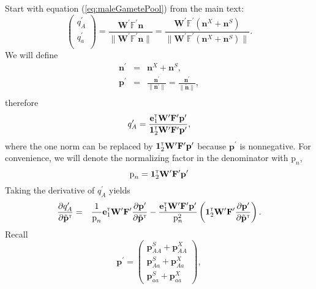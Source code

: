 \documentclass[11pt]{article}
\def\mbf#1{\mathbf{#1}}
\def\mbb#1{\mathbb{#1}}
\newcommand{\bo}[1]{{\bf #1}}
\newcommand{\tr}{{\mbox{\tiny \sf T}}}
\begin{document}
 Start with equation (\ref{eq:maleGametePool}) from the main text:
\begin{equation} \label{eq:maleGametePool_app}
	\left(
		\begin{array}{c}
			q^{\prime}_{A} \\
			q^{\prime}_{a} \\
		\end{array} \right) = 
			\frac{\mbf{W}^{\prime} \mbb{F}^{\prime} \mbf{n}}{\| \mbf{W}^{\prime} \mbb{F}^{\prime} \mbf{n} \|} = 
				\frac{\mbf{W}^{\prime} \mbb{F}^{\prime} (\mbf{n}^X+ \mbf{n}^S)}{\| \mbf{W}^{\prime} \mbb{F}^{\prime} (\mbf{n}^X+ \mbf{n}^S)\|}.
\end{equation}
We will define
\begin{eqnarray}
\mathbf{n}^\prime&=&\mbf{n}^X+ \mbf{n}^S, \\
\mathbf{p}^\prime&=&\frac{\mathbf{n}^\prime}{\|\mathbf{n}^\prime \|}=\frac{\mathbf{n}^\prime}{\|\tilde{\mathbf{n}}\|}, \\
\end{eqnarray}
therefore
\begin{equation}
  q^\prime_A=\frac{\mathbf{e}_1^\tr \mathbf{W}^\prime \mathbf{F}^\prime  \mathbf{p}^\prime}{\mathbf{1}^\tr_{2}\mathbf{W}^\prime\mathbf{F}^\prime\mathbf{p}^\prime}, \label{eq:male_gamete_pool}
\end{equation}
 where the one norm can be replaced by $\mathbf{1}^\tr_{2}\mathbf{W}^\prime\mathbf{F}^\prime \mathbf{p}^\prime$ because $\mathbf{p}^\prime$ is nonnegative. For convenience, we will denote the normalizing factor in the denominator with $ \mbox{p}_{n}$, 
 \begin{equation}
   \mbox{p}_{n}=\mathbf{1}^\tr_{2}\mathbf{W}^\prime\mathbf{F}^\prime \mathbf{p}^\prime
 \end{equation}
 Taking the derivative of $ q^\prime_A$ yields
\begin{eqnarray}
  \frac{\partial   q^\prime_A }{\partial \tilde{\bo p}^\tr}&=& \frac{1}{ \mbox{p}_{n}}\mathbf{e}_1^\tr \mathbf{W}^\prime \mathbf{F}^\prime   \frac{\partial  \mathbf{p}^\prime}{\partial \tilde{\bo p}^\tr} - \frac{\mathbf{e}_1^\tr \mathbf{W}^\prime \mathbf{F}^\prime \mathbf{p}^\prime}{ \mbox{p}_{n}^2} \left( \mathbf{1}^\tr_{2}\mathbf{W}^\prime\mathbf{F}^\prime \frac{\partial  \mathbf{p}^\prime}{\partial \tilde{\bo p}^\tr} \right). \label{eq:56_app}
\end{eqnarray}
Recall 
\begin{equation}
  \mathbf{p}^\prime=\left(\begin{array} {c}
\mathbf{p}^S_{AA}+\mathbf{p}^X_{AA}\\
\mathbf{p}^S_{Aa}+\mathbf{p}^X_{Aa}\\
\mathbf{p}^S_{aa}+\mathbf{p}^X_{aa}
  \end{array}\right),
\end{equation}
\end{document}
